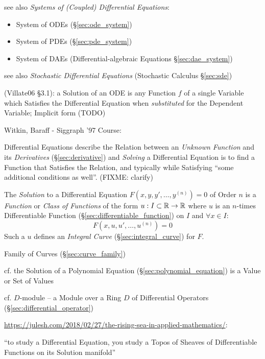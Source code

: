 {see also \emph{Systems of (Coupled) Differential Equations}:
\begin{itemize}
  \item System of ODEs (\S\ref{sec:ode_system})
  \item System of PDEs (\S\ref{sec:pde_system})
  \item System of DAEs (Differential-algebraic Equations \S\ref{sec:dae_system})
\end{itemize}

\fist see also \emph{Stochastic Differential Equations} (Stochastic Calculus
\S\ref{sec:sde})

(Villate06 \S 3.1): a Solution of an ODE is any Function $f$ of a single
Variable which Satisfies the Differential Equation when \emph{substituted} for
the Dependent Variable; Implicit form (TODO)

Witkin, Baraff - Siggraph '97 Course:

Differential Equations describe the Relation between an \emph{Unknown Function}
and its \emph{Derivatives} (\S\ref{sec:derivative}) and \emph{Solving} a
Differential Equation is to find a Function that Satisfies the Relation, and
typically while Satisfying ``some additional conditions as well''. (FIXME:
clarify)

\asterism

The \emph{Solution} to a Differential Equation $F(x,y,y',\ldots,y^{(n)}) = 0$
of Order $n$ is a \emph{Function} or \emph{Class of Functions} of the form $u :
I \subset \mathbb{R} \rightarrow \mathbb{R}$ where $u$ is an $n$-times Differentiable
Function (\S\ref{sec:differentiable_function}) on $I$ and $\forall x \in I$:
\[
  F(x,u,u',\ldots,u^{(n)}) = 0
\]
Such a $u$ defines an \emph{Integral Curve} (\S\ref{sec:integral_curve}) for
$F$.

\fist Family of Curves (\S\ref{sec:curve_family})

\fist cf. the Solution of a Polynomial Equation
(\S\ref{sec:polynomial_equation}) is a Value or Set of Values

\fist cf. $D$-module -- a Module over a Ring $D$ of Differential Operators
(\S\ref{sec:differential_operator})

\url{https://julesh.com/2018/02/27/the-rising-sea-in-applied-mathematics/}:

``to study a Differential Equation, you study a Topos of Sheaves of
Differentiable Functions on its Solution manifold''

}

